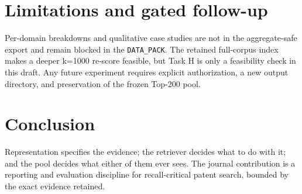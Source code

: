 \documentclass[preprint,12pt]{elsarticle}
\begin{document}
\section{Limitations and gated follow-up}
Per-domain breakdowns and qualitative case studies are not in the aggregate-safe export and remain blocked in the \texttt{DATA\_PACK}. The retained full-corpus index makes a deeper k=1000 re-score feasible, but Task H is only a feasibility check in this draft. Any future experiment requires explicit authorization, a new output directory, and preservation of the frozen Top-200 pool.

\section{Conclusion}
Representation specifies the evidence; the retriever decides what to do with it; and the pool decides what either of them ever sees. The journal contribution is a reporting and evaluation discipline for recall-critical patent search, bounded by the exact evidence retained.
\end{document}
